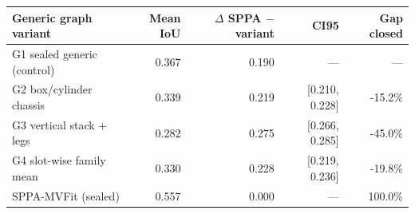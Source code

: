 \begin{tabular}{@{}lrrrr@{}}
\toprule
Generic graph variant & Mean IoU & $\Delta$ SPPA $-$ variant & CI95 & Gap closed \\
\midrule
G1 sealed generic (control) & 0.367 & 0.190 & --- & --- \\
G2 box/cylinder chassis & 0.339 & 0.219 & [0.210, 0.228] & -15.2\% \\
G3 vertical stack + legs & 0.282 & 0.275 & [0.266, 0.285] & -45.0\% \\
G4 slot-wise family mean & 0.330 & 0.228 & [0.219, 0.236] & -19.8\% \\
\midrule
SPPA-MVFit (sealed) & 0.557 & 0.000 & --- & 100.0\% \\
\bottomrule
\end{tabular}

